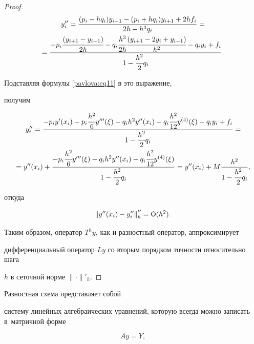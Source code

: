 \begin{proof}
\begin{multline*}
y''_i =\frac{(p_i -hq_i)y_{i-1} -(p_i +hq_i )y_{i+1} +2hf_i }{2h-h^3q_i

}=\\

=\frac{-p_i \cfrac{(y_{i+1} -y_{i-1})}{2h}-q_i \cfrac{h^3}{2h}\cfrac{(y_{i+1}

-2y_i +y_{i-1})}{h^2}-q_i y_i +f_i }{1-\cfrac{h^2}{2}q_i}.

\end{multline*}



Подставляя формулы \eqref{pavlova:eq11} в это выражение,

получим

\begin{multline*}

y''_i =\frac{-p_i y'(x_i)-p_i \cfrac{h^2}{6}y'''(\xi )-q_i

h^2y''(x_i)-q_i \cfrac{h^2}{12}y^{(4)}(\xi)-q_i

y_i +f_i}{1-\cfrac{h^2}{2}q_i}=\\

 =y''(x_i )+\frac{-p_i \cfrac{h^2}{6}y'''(\xi )-q_i h^2y''(x_i )-q_i

\cfrac{h^2}{12}y^{(4)}(\xi)}{1-\cfrac{h^2}{2}q_i}=y''(x_i)+M\frac{h^2}{1-\cfrac{h^2}{2}q_i},

\end{multline*}

откуда

$$

\left\| y''(x_i )-y''_i \right \|''_h ={\sf O}(h^2).

$$





Таким образом, оператор $T^hy$, как и разностный оператор,  аппроксимирует

дифференциальный оператор $Ly$ со вторым порядком точности относительно шага

$h$ в сеточной норме $\| \cdot  \|'_h $.

\end{proof}



\smallskip



 Разностная схема представляет собой

систему линейных алгебраических уравнений, которую всегда можно записать в~матричной форме \cite{pavlova:bib4}

\begin{equation}

\label{pavlova:eq12} Ay=Y,

\end{equation}

